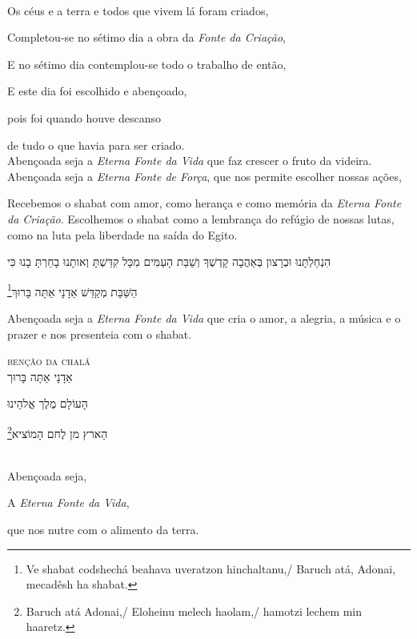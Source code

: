 \vspace*{1cm}

\textsc{}\\[15pt]

Os céus e a terra e todos que vivem lá foram criados,

Completou-se no sétimo dia a obra da \emph{Fonte da Criação},

E no sétimo dia contemplou-se todo o trabalho de então,

E este dia foi escolhido e abençoado,

pois foi quando houve descanso

de tudo o que havia para ser criado.\\[10pt]

Abençoada seja a \emph{Eterna Fonte da Vida} que faz crescer o \qb{}fruto da videira.\\[10pt]

Abençoada seja a \emph{Eterna Fonte de Força}, que nos permite \qb{}escolher nossas ações,

Recebemos o shabat com amor, como herança e como memória da \emph{Eterna
Fonte da Criação}. Escolhemos o shabat como a lembrança do refúgio de
nossas lutas, como na luta pela liberdade na saída do Egito.\\[10pt]


\movetoevenpage
\raggedleft

\vspace*{1cm}


הִנְחַלְתָּנוּ וּבְרָצון בְּאַהֲבָה קָדְשְׁךָ וְשַׁבַּת הָעַמִּים מִכָּל קִדַּשְׁתָּ וְאותָנוּ בָחַרְתָּ בָנוּ כִּי

הַשַּׁבָּת מְקַדֵּשׁ אַדָנָי אַתָּה בָּרוּךְ\footnote{Ve shabat codshechá beahava uveratzon hinchaltanu,/
Baruch atá, Adonai, mecadêsh ha shabat.}

\movetooddpage
\raggedright

\vspace*{1cm}


Abençoada seja a \emph{Eterna Fonte da Vida} que cria o amor, a alegria,
a música e o prazer e nos presenteia com o shabat.

\movetoevenpage
\raggedleft


\vspace*{1cm}

\textsc{benção da chalá}\\[15pt]

אַדָנָי אַתָּה בָּרוּך

הָעוֹלָם מֶלֶך אֱלהֵינוּ 

הַארץ מן לֶחם הָמוֹציא\footnote{Baruch atá Adonai,/ Eloheinu melech haolam,/ hamotzi lechem min haaretz.}

\movetooddpage
\raggedright

\vspace*{1cm}

\textsc{}\\[15pt]

Abençoada seja,

A \emph{Eterna Fonte da Vida}, 

que nos nutre com o alimento da terra.
